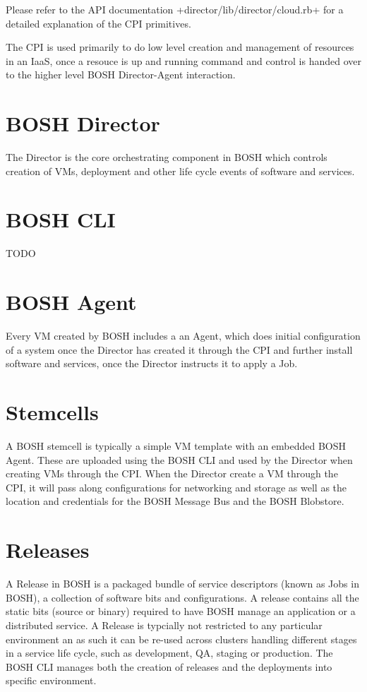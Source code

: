 Please refer to the API documentation +director\slash lib\slash director\slash cloud.rb+
for a detailed explanation of the CPI primitives.

The CPI is used primarily to do low level creation and management of
resources in an IaaS, once a resouce is up and running command and
control is handed over to the higher level BOSH Director-Agent
interaction.

\section{BOSH Director}
\label{boshdirector}

The Director is the core orchestrating component in BOSH which controls
creation of VMs, deployment and other life cycle events of software and
services.

\section{BOSH CLI}
\label{boshcli}

TODO

\section{BOSH Agent}
\label{boshagent}

Every VM created by BOSH includes a an Agent, which does initial
configuration of a system once the Director has created it through the
CPI and further install software and services, once the Director
instructs it to apply a Job.

\section{Stemcells}
\label{stemcells}

A BOSH stemcell is typically a simple VM template with an embedded BOSH
Agent. These are uploaded using the BOSH CLI and used by the Director
when creating VMs through the CPI. When the Director create a VM through
the CPI, it will pass along configurations for networking and storage as
well as the location and credentials for the BOSH Message Bus and the
BOSH Blobstore.

\section{Releases}
\label{releases}

A Release in BOSH is a packaged bundle of service descriptors (known as
Jobs in BOSH), a collection of software bits and configurations. A
release contains all the static bits (source or binary) required to have
BOSH manage an application or a distributed service. A Release is
typcially not restricted to any particular environment an as such it can
be re-used across clusters handling different stages in a service life
cycle, such as development, QA, staging or production. The BOSH CLI
manages both the creation of releases and the deployments into specific
environment.

